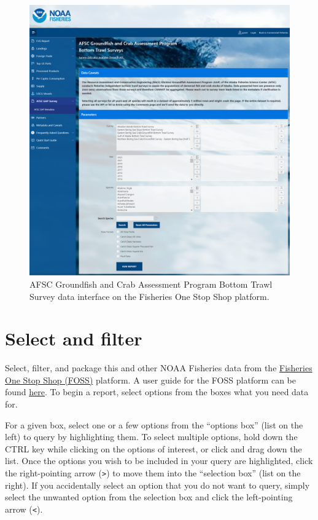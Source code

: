 \documentclass[
  letterpaper,
  oneside,
  open=any]{scrbook}
\begin{document}
\begin{figure}

{\centering \includegraphics[width=6.24in,height=\textheight]{content/../img/foss_1_interface.png}

}

\caption{AFSC Groundfish and Crab Assessment Program Bottom Trawl Survey
data interface on the Fisheries One Stop Shop platform.}

\end{figure}

\hypertarget{select-and-filter}{%
\section{Select and filter}\label{select-and-filter}}

Select, filter, and package this and other NOAA Fisheries data from the
\href{https://www.fisheries.noaa.gov/foss}{Fisheries One Stop Shop
(FOSS)} platform. A user guide for the FOSS platform can be found
\href{https://www.fisheries.noaa.gov/foss/f?p=215:7:7542600605674:::::}{here}.
To begin a report, select options from the boxes what you need data for.

For a given box, select one or a few options from the ``options box''
(list on the left) to query by highlighting them. To select multiple
options, hold down the CTRL key while clicking on the options of
interest, or click and drag down the list. Once the options you wish to
be included in your query are highlighted, click the right-pointing
arrow (\texttt{\textgreater{}}) to move them into the ``selection box''
(list on the right). If you accidentally select an option that you do
not want to query, simply select the unwanted option from the selection
box and click the left-pointing arrow (\texttt{\textless{}}).
\end{document}
